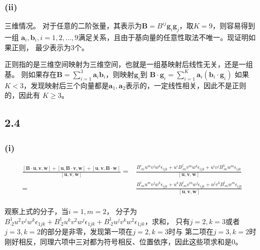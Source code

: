\documentclass[UTF8,zihao=5]{ctexart}
\newcommand{\bm}[1]{{\mathbf{#1}}}
\begin{document}
\subsubsection*{(ii)}

三维情况。
对于任意的二阶张量，其表示为$\bm{B}=B^{ij}\bm{g}_i\bm{g}_j$，取$K=9$，则容易得到一组
$\bm{a}_i,\bm{b}_i, i=1,2,\dots,9$满足关系，且由于基向量的任意性取法不唯一。现证明如果正则，
最少表示为3个。

正则指的是三维空间映射为三维空间，也就是一组基映射后线性无关，还是一组基。
则如果存在$\bm{B}=\sum_{i=1}^{3}{\bm{a}_i\bm{b}_i}$，则映射$\bm{g}_i$到
$\bm{B}\cdot\bm{g}_i=\sum_{i=1}^{K}{\bm{a}_i\left(\bm{b}_i\cdot\bm{g}_i\right)}$
如果$K<3$，发现映射后三个向量都是$\bm{a}_1,\bm{a}_2$表示的，一定线性相关，因此不是正则的，因此有
$K\ge3$。

\subsection*{2.4}


\subsubsection*{(i)}
\begin{equation}
    \begin{aligned}
        \frac{
        [\bm{B}\cdot\bm{u}, \bm{v}, \bm{w}]+
        [\bm{u}, \bm{B}\cdot\bm{v}, \bm{w}]+
        [\bm{u}, \bm{v}, \bm{B}\cdot\bm{w}]}{[\bm{u}, \bm{v}, \bm{w}]}
        = &
        \frac{
        B^i_{\cdot m}u^mv^jw^k\epsilon_{ijk}+
        u^iB^j_{\cdot m}v^mw^k\epsilon_{ijk}+
        u^iv^jB^k_{\cdot m}w^m\epsilon_{ijk}}
        {[\bm{u}, \bm{v}, \bm{w}]} \\
        = &
        \frac{
        B^i_{\cdot m}u^mv^jw^k\epsilon_{ijk}+
        u^kB^i_{\cdot m}v^mw^j\epsilon_{ijk}+
        u^jv^kB^i_{\cdot m}w^m\epsilon_{ijk}}
        {[\bm{u}, \bm{v}, \bm{w}]} \\
    \end{aligned}
\end{equation}

观察上式的分子，当$i=1,m=2$，
分子为$B^1_{\cdot 2}u^2v^jw^k\epsilon_{1jk}+B^1_{\cdot 2}u^kv^2w^j\epsilon_{1jk}+B^1_{\cdot 2}u^jv^kw^2\epsilon_{1jk}$，求和，
只有$j=2,k=3$或者$j=3,k=2$的部分是非零，发现第一项在$j=2,k=3$时与
第二项在$j=3,k=2$时刚好相反，同理六项中三对都为符号相反、位置依序，因此这些项求和是0。
\end{document}
